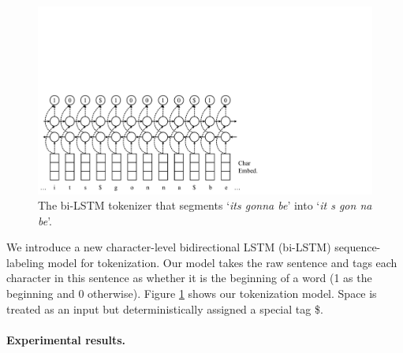 \documentclass[11pt,a4paper]{article}
\begin{document}
\begin{figure}[t]
	\centering
	\includegraphics[width=\columnwidth,trim={0 0 11cm 9cm},clip]{graphics/bilstm_tokenizer}
	\caption{The bi-LSTM tokenizer that segments `{\it its gonna be}' into `{\it it s gon na be}'.}\label{fig:tok-model}
\end{figure}
We introduce a new
character-level bidirectional LSTM (bi-LSTM) sequence-labeling model
\cite{DBLP:journals/corr/HuangXY15,ma-hovy:2016:P16-1}
for tokenization.
Our model takes the raw sentence and tags each character in this 
sentence as whether it is the beginning of a word (1 as the beginning and 0 otherwise).
Figure \ref{fig:tok-model} shows our tokenization model.
Space is treated as an input but deterministically  assigned a special tag \$.

\paragraph{Experimental results.}
\end{document}
